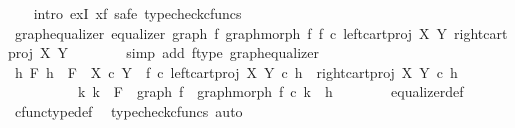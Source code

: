 \begin{isabellebody}
\ \ \isamarkupfalse%
\ {\isacharparenleft}{\kern0pt}intro\ exI{\isacharbrackleft}{\kern0pt}\ x{\isacharequal}{\kern0pt}f{\isacharbrackright}{\kern0pt}{\isacharcomma}{\kern0pt}\ safe{\isacharcomma}{\kern0pt}\ typecheck{\isacharunderscore}{\kern0pt}cfuncs{\isacharparenright}{\kern0pt}\isanewline
\ \ \ \ \isamarkupfalse%
\ graph{\isacharunderscore}{\kern0pt}equalizer{\isacharcolon}{\kern0pt}\ {\isachardoublequoteopen}equalizer\ {\isacharparenleft}{\kern0pt}graph\ f{\isacharparenright}{\kern0pt}\ {\isacharparenleft}{\kern0pt}graph{\isacharunderscore}{\kern0pt}morph\ f{\isacharparenright}{\kern0pt}\ {\isacharparenleft}{\kern0pt}f\ {\isasymcirc}\isactrlsub c\ left{\isacharunderscore}{\kern0pt}cart{\isacharunderscore}{\kern0pt}proj\ X\ Y{\isacharparenright}{\kern0pt}\ {\isacharparenleft}{\kern0pt}right{\isacharunderscore}{\kern0pt}cart{\isacharunderscore}{\kern0pt}proj\ X\ Y{\isacharparenright}{\kern0pt}{\isachardoublequoteclose}\isanewline
\ \ \ \ \ \ \isamarkupfalse%
\ {\isacharparenleft}{\kern0pt}simp\ add{\isacharcolon}{\kern0pt}\ f{\isacharunderscore}{\kern0pt}type\ graph{\isacharunderscore}{\kern0pt}equalizer{}{\isacharparenright}{\kern0pt}\isanewline
\ \ \ \ \isamarkupfalse%
\ \isamarkupfalse%
\ {\isachardoublequoteopen}{\isasymforall}h\ F{\isachardot}{\kern0pt}\ h\ {\isacharcolon}{\kern0pt}\ F\ {\isasymrightarrow}\ X\ {\isasymtimes}\isactrlsub c\ Y\ {\isasymand}\ {\isacharparenleft}{\kern0pt}f\ {\isasymcirc}\isactrlsub c\ left{\isacharunderscore}{\kern0pt}cart{\isacharunderscore}{\kern0pt}proj\ X\ Y{\isacharparenright}{\kern0pt}\ {\isasymcirc}\isactrlsub c\ h\ {\isacharequal}{\kern0pt}\ right{\isacharunderscore}{\kern0pt}cart{\isacharunderscore}{\kern0pt}proj\ X\ Y\ {\isasymcirc}\isactrlsub c\ h\ {\isasymlongrightarrow}\isanewline
\ \ \ \ \ \ \ \ \ \ {\isacharparenleft}{\kern0pt}{\isasymexists}{\isacharbang}{\kern0pt}k{\isachardot}{\kern0pt}\ k\ {\isacharcolon}{\kern0pt}\ F\ {\isasymrightarrow}\ graph\ f\ {\isasymand}\ graph{\isacharunderscore}{\kern0pt}morph\ f\ {\isasymcirc}\isactrlsub c\ k\ {\isacharequal}{\kern0pt}\ h{\isacharparenright}{\kern0pt}{\isachardoublequoteclose}\isanewline
\ \ \ \ \ \ \isamarkupfalse%
\ equalizer{\isacharunderscore}{\kern0pt}def\ \isamarkupfalse%
\ cfunc{\isacharunderscore}{\kern0pt}type{\isacharunderscore}{\kern0pt}def\ \isamarkupfalse%
\ {\isacharparenleft}{\kern0pt}typecheck{\isacharunderscore}{\kern0pt}cfuncs{\isacharcomma}{\kern0pt}\ auto{\isacharparenright}{\kern0pt}\isanewline

\end{isabellebody}
